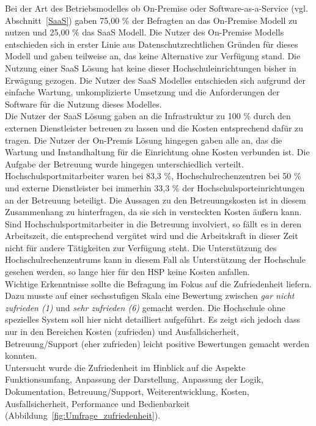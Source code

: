 Bei der Art des Betriebsmodelles ob On-Premise oder Software-as-a-Service (vgl. Abschnitt~\ref{SaaS}) gaben 75,00 \% der Befragten an das On-Premise Modell zu nutzen und 25,00 \% das SaaS Modell. Die Nutzer des On-Premise Modells entschieden sich in erster Linie aus Datenschutzrechtlichen Gründen für dieses Modell und gaben teilweise an, das keine Alternative zur Verfügung stand. Die Nutzung einer SaaS Lösung hat keine dieser Hochschuleinrichtungen bisher in Erwägung gezogen. Die Nutzer des SaaS Modelles entschieden sich aufgrund der einfache Wartung, unkomplizierte Umsetzung und die Anforderungen der Software für die Nutzung dieses Modelles.
\\
Die Nutzer der SaaS Lösung gaben an die Infrastruktur zu 100 \% durch den externen Dienstleister betreuen zu lassen und die Kosten entsprechend dafür zu tragen. Die Nutzer der On-Premis Lösung hingegen gaben alle an, das die Wartung und Instandhaltung für die Einrichtung ohne Kosten verbunden ist. Die Aufgabe der Betreuung wurde hingegen unterschiedlich verteilt. Hochschulsportmitarbeiter waren bei 83,3 \%, Hochschulrechenzentren bei 50 \% und externe Dienstleister bei immerhin 33,3 \% der Hochschulsporteinrichtungen an der Betreuung beteiligt. Die Aussagen zu den Betreuungskosten ist in diesem Zusammenhang zu hinterfragen, da sie sich in versteckten Kosten äußern kann. Sind Hochschulsportmitarbeiter in die Betreuung involviert, so fällt es in deren Arbeitszeit, die entsprechend vergütet wird und die Arbeitskraft in dieser Zeit nicht für andere Tätigkeiten zur Verfügung steht. Die Unterstützung des Hochschulrechenzentrums kann in diesem Fall als Unterstützung der Hochschule gesehen werden, so lange hier für den HSP keine Kosten anfallen.
\\

Wichtige Erkenntnisse sollte die Befragung im Fokus auf die Zufriedenheit liefern. Dazu musste auf einer sechsstufigen Skala eine Bewertung zwischen \textit{gar nicht zufrieden (1)} und \textit{sehr zufrieden (6)} gemacht werden. Die Hochschule ohne spezielles System soll hier nicht detailliert aufgeführt. Es zeigt sich jedoch dass nur in den Bereichen Kosten (zufrieden) und Ausfallsicherheit, Betreuung/Support (eher zufrieden) leicht positive Bewertungen gemacht werden konnten. 
\\
Untersucht wurde die Zufriedenheit im Hinblick auf die Aspekte Funktionsumfang, Anpassung der Darstellung, Anpassung der Logik, Dokumentation, Betreuung/Support, Weiterentwicklung, Kosten, Ausfallsicherheit, Performance und Bedienbarkeit (Abbildung~\ref{fig:Umfrage_zufriedenheit}).

